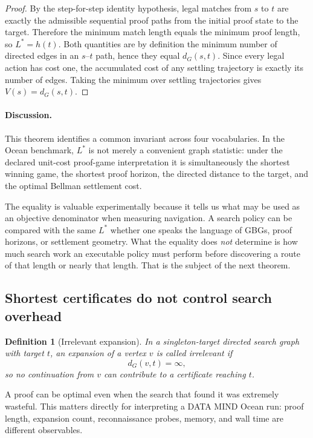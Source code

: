 \documentclass[11pt]{article}
\newtheorem{definition}{Definition}
\begin{document}
\begin{proof}
By the step-for-step identity hypothesis, legal matches from $s$ to $t$ are exactly
the admissible sequential proof paths from the initial proof state to the target.  Therefore the minimum match
length equals the minimum proof length, so $L^*=h(t)$.  Both quantities are by
definition the minimum number of directed edges in an $s$--$t$ path, hence
they equal $d_G(s,t)$.  Since every legal action has cost one, the accumulated
cost of any settling trajectory is exactly its number of edges.  Taking the
minimum over settling trajectories gives $V(s)=d_G(s,t)$.
\end{proof}

\paragraph{Discussion.}
This theorem identifies a common invariant across four vocabularies.  In the
Ocean benchmark, $L^*$ is not merely a convenient graph statistic: under the
declared unit-cost proof-game interpretation it is simultaneously the shortest
winning game, the shortest proof horizon, the directed distance to the target,
and the optimal Bellman settlement cost.

The equality is valuable experimentally because it tells us what may be used
as an objective denominator when measuring navigation.  A search policy can be
compared with the same $L^*$ whether one speaks the language of GBGs, proof
horizons, or settlement geometry.  What the equality does \emph{not} determine
is how much search work an executable policy must perform before discovering a
route of that length or nearly that length.  That is the subject of the next
theorem.

\subsection{Shortest certificates do not control search overhead}

\begin{definition}[Irrelevant expansion]
In a singleton-target directed search graph with target $t$, an expansion of a
vertex $v$ is called \emph{irrelevant} if
\[
d_G(v,t)=\infty,
\]
so no continuation from $v$ can contribute to a certificate reaching $t$.
\end{definition}

A proof can be optimal even when the search that found it was extremely
wasteful.  This matters directly for interpreting a DATA MIND Ocean run: proof
length, expansion count, reconnaissance probes, memory, and wall time are
different observables.
\end{document}
